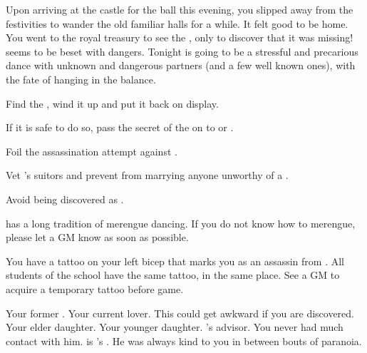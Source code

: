 \documentclass[char]{NeptuneBall}
\begin{document}
Upon arriving at the castle for the ball this evening, you slipped away from the festivities to wander the old familiar halls for a while. It felt good to be home. You went to the royal treasury to see the \iMusicBox{\MYname}, only to discover that it was missing! \pAtlantis{} seems to be beset with dangers. Tonight is going to be a stressful and precarious dance with unknown and dangerous partners (and a few well known ones), with the fate of \pAtlantis{} hanging in the balance.


\begin{itemz}[Goals]
  \item Find the \iMusicBox{}, wind it up and put it back on display.
  \item If it is safe to do so, pass the secret of the \iMusicBox{} on to \cAriel{} or \cPrincess{}.
  \item Foil the assassination attempt against \cKing{}.
  \item Vet \cPrincess{}'s suitors and prevent \cPrincess{\them} from marrying anyone unworthy of a \cPrincess{\prince}.
  \item Avoid being discovered as \cQueen{\King} \cQueen{}.
\end{itemz}


\begin{itemz}[Notes]
  \item \pAtlantis{} has a long tradition of merengue dancing. If you do not know how to merengue, please let a GM know as soon as possible.
  \item You have a tattoo on your left bicep that marks you as an assassin from \pAssassin{}. All students of the school have the same tattoo, in the same place. See a GM to acquire a temporary tattoo before game.
\end{itemz}

\begin{contacts}
  \contact{\cKing{}} Your former \cKing{\spouse}.
  \contact{\cGeneral{}} Your current lover. This could get awkward if you are discovered.
  \contact{\cAriel{}} Your elder daughter.
  \contact{\cPrincess{}} Your younger daughter.
  \contact{\cManta{}} \cKing{}'s advisor. You never had much contact with him.
  \contact{\cPlant{}} \cPlant{} is \cKing{}'s \cPlant{\sibling}. He was always kind to you in between bouts of paranoia.
\end{contacts}
\end{document}
